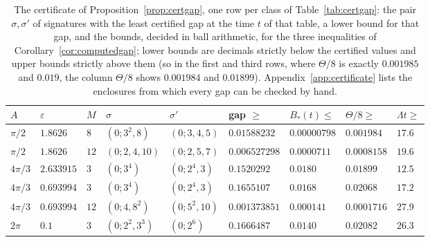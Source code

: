 \documentclass[pdflatex,sn-mathphys-num]{sn-jnl}
\theoremstyle{thmstyleone}%
\theoremstyle{thmstylethree}%
\begin{document}
\begin{table}[t]
\centering\footnotesize
\caption{The certificate of Proposition~\ref{prop:certgap}, one row per class of Table~\ref{tab:certgap}: the pair $\sigma,\sigma'$ of signatures with the least certified gap at the time $t$ of that table, a lower bound for that gap, and the bounds, decided in ball arithmetic, for the three inequalities of Corollary~\ref{cor:computedgap}; lower bounds are decimals strictly below the certified values and upper bounds strictly above them (so in the first and third rows, where $\Theta/8$ is exactly $0.001985$ and $0.019$, the column $\Theta/8$ shows $0.001984$ and $0.01899$). Appendix~\ref{app:certificate} lists the enclosures from which every gap can be checked by hand.}\label{tab:certdetail}
\setlength{\tabcolsep}{4pt}\begin{tabular}{@{}lllllllll@{}}
\toprule
$A$ & $\varepsilon$ & $M$ & $\sigma$ & $\sigma'$ & gap $\ge$ & $B_*(t)\le$ & $\Theta/8\ge$ & $\Lambda t\ge$\\
\midrule
$\pi/2$ & $1.8626$ & $8$ & $(0;3^2,8)$ & $(0;3,4,5)$ & $0.01588232$ & $0.00000798$ & $0.001984$ & $17.6$\\
$\pi/2$ & $1.8626$ & $12$ & $(0;2,4,10)$ & $(0;2,5,7)$ & $0.006527298$ & $0.0000711$ & $0.0008158$ & $19.6$\\
$4\pi/3$ & $2.633915$ & $3$ & $(0;3^4)$ & $(0;2^4,3)$ & $0.1520292$ & $0.0180$ & $0.01899$ & $12.5$\\
$4\pi/3$ & $0.693994$ & $3$ & $(0;3^4)$ & $(0;2^4,3)$ & $0.1655107$ & $0.0168$ & $0.02068$ & $17.2$\\
$4\pi/3$ & $0.693994$ & $12$ & $(0;4,8^2)$ & $(0;5^2,10)$ & $0.001373851$ & $0.000141$ & $0.0001716$ & $27.9$\\
$2\pi$ & $0.1$ & $3$ & $(0;2^2,3^3)$ & $(0;2^6)$ & $0.1666487$ & $0.0140$ & $0.02082$ & $26.3$\\
\bottomrule
\end{tabular}
\end{table}
\end{document}
